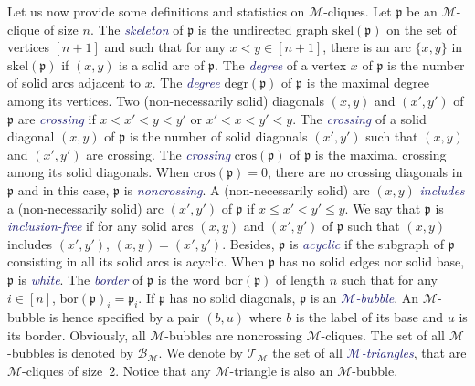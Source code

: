 \documentclass[10pt,reqno]{amsart}
\numberwithin{equation}{subsection}
\renewcommand{\leq}{\leqslant}
\newcommand{\Mca}{\mathcal{M}}
\newcommand{\Pfr}{\mathfrak{p}}
\newcommand{\Bubbles}{\mathcal{B}}
\newcommand{\Triangles}{\mathcal{T}}
\newcommand{\Border}{\mathrm{bor}}
\newcommand{\Cros}{\mathrm{cros}}
\newcommand{\Degr}{\mathrm{degr}}
\newcommand{\Skel}{\mathrm{skel}}
\newcommand{\Def}[1]{\textcolor{MidnightBlue}{\em #1}}
\begin{document}
Let us now provide some definitions and statistics on
$\Mca$-cliques. Let $\Pfr$ be an $\Mca$-clique of size $n$. The
\Def{skeleton} of $\Pfr$ is the undirected graph $\Skel(\Pfr)$ on the
set of vertices $[n + 1]$ and such that for any $x < y \in [n + 1]$,
there is an arc $\{x, y\}$ in $\Skel(\Pfr)$ if $(x, y)$ is a solid arc
of $\Pfr$. The \Def{degree} of a vertex $x$ of $\Pfr$ is the number of
solid arcs adjacent to $x$. The \Def{degree} $\Degr(\Pfr)$ of $\Pfr$ is
the maximal degree among its vertices. Two (non-necessarily solid)
diagonals $(x, y)$ and $(x', y')$ of $\Pfr$ are \Def{crossing} if
$x < x' < y < y'$ or $x' < x < y' < y$. The \Def{crossing} of a solid
diagonal $(x, y)$ of $\Pfr$ is the number of solid diagonals $(x', y')$
such that $(x, y)$ and $(x', y')$ are crossing. The \Def{crossing}
$\Cros(\Pfr)$ of $\Pfr$ is the maximal crossing among its solid
diagonals. When $\Cros(\Pfr) = 0$, there are no crossing diagonals in
$\Pfr$ and in this case, $\Pfr$ is \Def{noncrossing}. A (non-necessarily
solid) arc $(x, y)$ \Def{includes} a (non-necessarily solid) arc
$(x', y')$ of $\Pfr$ if $x \leq x' < y' \leq y$. We say that $\Pfr$ is
\Def{inclusion-free} if for any solid arcs $(x, y)$ and $(x', y')$ of
$\Pfr$ such that $(x, y)$ includes $(x', y')$, $(x, y) = (x', y')$.
Besides, $\Pfr$ is \Def{acyclic} if the subgraph of $\Pfr$ consisting in
all its solid arcs is acyclic.  When $\Pfr$ has no solid edges nor solid
base, $\Pfr$ is \Def{white}. The \Def{border} of $\Pfr$ is the word
$\Border(\Pfr)$ of length $n$ such that for any $i \in [n]$,
$\Border(\Pfr)_i = \Pfr_i$. If $\Pfr$ has no solid diagonals, $\Pfr$ is
an \Def{$\Mca$-bubble}. An $\Mca$-bubble is hence specified by a pair
$(b, u)$ where $b$ is the label of its base and $u$ is its border.
Obviously, all $\Mca$-bubbles are noncrossing $\Mca$-cliques. The set of
all $\Mca$-bubbles is denoted by $\Bubbles_\Mca$. We denote by
$\Triangles_\Mca$ the set of all \Def{$\Mca$-triangles}, that are
$\Mca$-cliques of size~$2$. Notice that any $\Mca$-triangle is also an
$\Mca$-bubble.
\medskip

\end{document}
